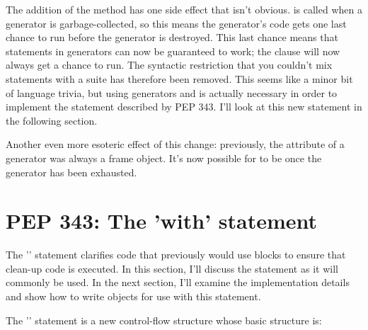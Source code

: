 \documentclass{howto}
\begin{document}
The addition of the  method has one side effect that
isn't obvious.   is called when a generator is
garbage-collected, so this means the generator's code gets one last
chance to run before the generator is destroyed.  This last chance
means that  statements in generators can now be
guaranteed to work; the  clause will now always get a
chance to run.  The syntactic restriction that you couldn't mix
 statements with a  suite has
therefore been removed.  This seems like a minor bit of language
trivia, but using generators and  is actually
necessary in order to implement the   statement
described by PEP 343.  I'll look at this new statement in the following 
section.

Another even more esoteric effect of this change: previously, the
 attribute of a generator was always a frame object.
It's now possible for  to be 
once the generator has been exhausted.

\begin{seealso}




\end{seealso}


\section{PEP 343: The 'with' statement\label{pep-343}}

The '' statement clarifies code that previously would
use  blocks to ensure that clean-up code is
executed.  In this section, I'll discuss the statement as it will
commonly be used.  In the next section, I'll examine the
implementation details and show how to write objects for use with this
statement.

The '' statement is a new control-flow structure whose
basic structure is:
\end{document}
